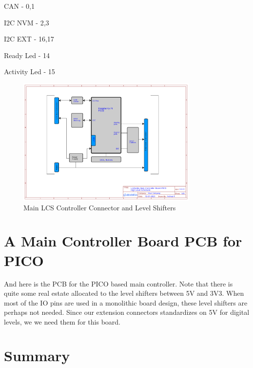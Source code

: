 CAN             - 0,1

I2C NVM         - 2,3

I2C EXT         - 16,17

Ready Led       - 14

Activity Led    - 15



\begin{figure}[htbp]
    \centering
    \includegraphics[page=3, width=0.8\textwidth]{./Schematics/Schematic_LcsNodes-Main-Controller-Board.pdf}
    \caption{Main LCS Controller Connector and Level Shifters}
\end{figure}
\FloatBarrier

\section{A Main Controller Board PCB for PICO}

And here is the PCB for the PICO based main controller. Note that there is quite some real estate allocated to the level shifters between 5V and 3V3. When most of the IO pins are used in a monolithic board design, these level shifters are perhaps not needed. Since our extension connectors standardizes on 5V for digital levels, we we need them for this board.

\FloatBarrier

\section{Summary}

